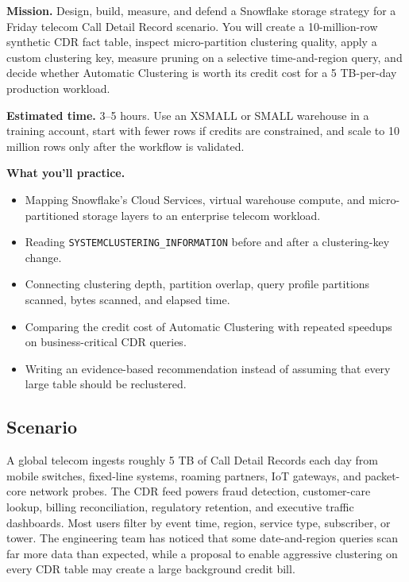 \begin{capstonebox}
\textbf{Mission.} Design, build, measure, and defend a Snowflake storage strategy for a Friday telecom Call Detail Record scenario. You will create a 10-million-row synthetic CDR fact table, inspect micro-partition clustering quality, apply a custom clustering key, measure pruning on a selective time-and-region query, and decide whether Automatic Clustering is worth its credit cost for a 5 TB-per-day production workload.

\textbf{Estimated time.} 3--5 hours. Use an XSMALL or SMALL warehouse in a training account, start with fewer rows if credits are constrained, and scale to 10 million rows only after the workflow is validated.

\textbf{What you'll practice.}
\begin{itemize}
    \item Mapping Snowflake's Cloud Services, virtual warehouse compute, and micro-partitioned storage layers to an enterprise telecom workload.
    \item Reading \texttt{SYSTEM\textdollar CLUSTERING\_INFORMATION} before and after a clustering-key change.
    \item Connecting clustering depth, partition overlap, query profile partitions scanned, bytes scanned, and elapsed time.
    \item Comparing the credit cost of Automatic Clustering with repeated speedups on business-critical CDR queries.
    \item Writing an evidence-based recommendation instead of assuming that every large table should be reclustered.
\end{itemize}
\end{capstonebox}

\subsection*{Scenario}
A global telecom ingests roughly 5 TB of Call Detail Records each day from mobile switches, fixed-line systems, roaming partners, IoT gateways, and packet-core network probes. The CDR feed powers fraud detection, customer-care lookup, billing reconciliation, regulatory retention, and executive traffic dashboards. Most users filter by event time, region, service type, subscriber, or tower. The engineering team has noticed that some date-and-region queries scan far more data than expected, while a proposal to enable aggressive clustering on every CDR table may create a large background credit bill.

